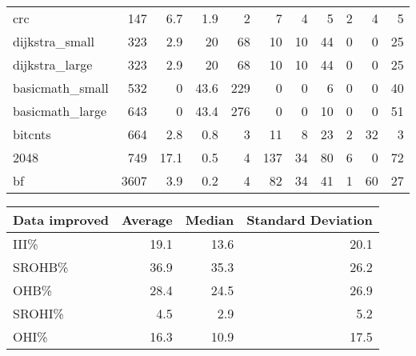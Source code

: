 \begin{tabular}{lrrrrrrrrrr}
\hline
 crc             &            147 &      6.7 &    1.9 &    2 &      7 &          4 &            5 &     2 &     4 &     5 \\
 dijkstra\_small  &            323 &      2.9 &   20   &   68 &     10 &         10 &           44 &     0 &     0 &    25 \\
 dijkstra\_large  &            323 &      2.9 &   20   &   68 &     10 &         10 &           44 &     0 &     0 &    25 \\
 basicmath\_small &            532 &      0   &   43.6 &  229 &      0 &          0 &            6 &     0 &     0 &    40 \\
 basicmath\_large &            643 &      0   &   43.4 &  276 &      0 &          0 &           10 &     0 &     0 &    51 \\
 bitcnts         &            664 &      2.8 &    0.8 &    3 &     11 &          8 &           23 &     2 &    32 &     3 \\
 2048            &            749 &     17.1 &    0.5 &    4 &    137 &         34 &           80 &     6 &     0 &    72 \\
 bf              &           3607 &      3.9 &    0.2 &    4 &     82 &         34 &           41 &     1 &    60 &    27 \\
\hline
\end{tabular}\begin{tabular}{lrrr}
\hline
 Data improved   &   Average &   Median &   Standard Deviation \\
\hline
 III\%            &      19.1 &     13.6 &                 20.1 \\
 SROHB\%          &      36.9 &     35.3 &                 26.2 \\
 OHB\%            &      28.4 &     24.5 &                 26.9 \\
 SROHI\%          &       4.5 &      2.9 &                  5.2 \\
 OHI\%            &      16.3 &     10.9 &                 17.5 \\
\hline
\end{tabular}
